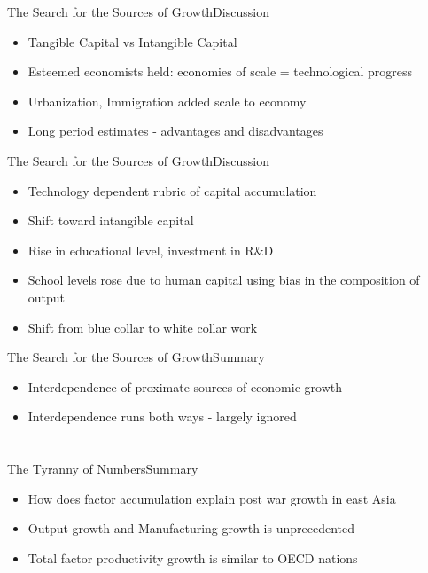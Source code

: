 \documentclass{beamer}
\begin{document}
\begin{frame}{The Search for the Sources of Growth}{Discussion}
\begin{itemize}
\item{Tangible Capital vs Intangible Capital}
\item{Esteemed economists held: economies of scale = technological progress}
\item{Urbanization, Immigration added scale to economy}
\item{Long period estimates - advantages and disadvantages}
\end{itemize}
\end{frame}

\begin{frame}{The Search for the Sources of Growth}{Discussion}
\begin{itemize}
\item{Technology dependent rubric of capital accumulation}
\item{Shift toward intangible capital}
\item{Rise in educational level, investment in R\&D}
\item{School levels rose due to human capital using bias in the composition of output}
\item{Shift from blue collar to white collar work}
\end{itemize}
\end{frame}

\begin{frame}{The Search for the Sources of Growth}{Summary}
\begin{itemize}
\item{Interdependence of proximate sources of economic growth}
\item{Interdependence runs both ways - largely ignored}
\end{itemize}
\end{frame}

\section{\cite{Young1994}}
\begin{frame}{The Tyranny of Numbers}{Summary}
\begin{itemize}
\item{How does factor accumulation explain post war growth in east Asia}
\item{Output growth and Manufacturing growth is unprecedented}
\item{Total factor productivity growth is similar to OECD nations}
\end{itemize}
\end{frame}
\end{document}
